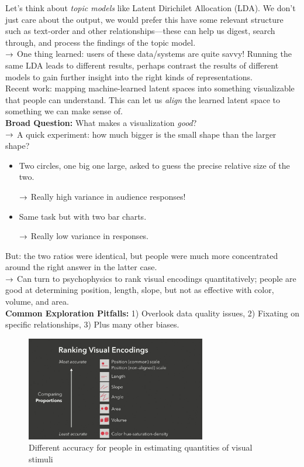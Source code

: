 Let's think about {\it topic models} like Latent Dirichilet Allocation (LDA). We don't just care about the output, we would prefer this have some relevant structure such as text-order and other relationships---these can help us digest, search through, and process the findings of the topic model. \\

$\rightarrow$ One thing learned: users of these data/systems are quite savvy! Running the same LDA leads to different results, perhaps contrast the results of different models to gain further insight into the right kinds of representations. \\

Recent work: mapping machine-learned latent spaces into something visualizable that people can understand. This can let us {\it align} the learned latent space to something we can make sense of. \\

{\bf Broad Question:} What makes a visualization {\it good}? \\

$\rightarrow$ A quick experiment: how much bigger is the small shape than the larger shape?
\begin{itemize}
    \item Two circles, one big one large, asked to guess the precise relative size of the two.
    
    $\rightarrow$ Really high variance in audience responses!
    
    \item Same task but with two bar charts.
    
    $\rightarrow$ Really low variance in responses.
\end{itemize}

But: the two ratios were identical, but people were much more concentrated around the right answer in the latter case. \\

$\rightarrow$ Can turn to psychophysics to rank visual encodings quantitatively; people are good at determining position, length, slope, but not as effective with color, volume, and area. \\

{\bf Common Exploration Pitfalls:} 1) Overlook data quality issues, 2) Fixating on specific relationships, 3) Plus many other biases. \\

\begin{figure}[h!]
    \centering
    \includegraphics[width=0.7\textwidth]{figures/psychphys.png}
    \caption{Different accuracy for people in estimating quantities of visual stimuli}
    \label{fig:psychphys}
\end{figure}

